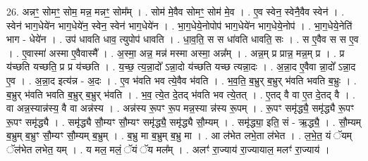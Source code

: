 \documentclass[17pt]{extarticle}
\begin{document}
26. अन्नꣳ॒॒ सोमꣳ॒॒ सोम॒ मन्न॒ मन्नꣳ॒॒ सोम᳚म् । . सोम॑ मे॒वैव सोमꣳ॒॒ सोम॑ मे॒व । . ए॒व स्वेन॒ स्वेनै॒वैव स्वेन॑ । . स्वेन॑ भाग॒धेये॑न भाग॒धेये॑न॒ स्वेन॒ स्वेन॑ भाग॒धेये॑न । . भा॒ग॒धेये॒नोपोप॑ भाग॒धेये॑न भाग॒धेये॒नोप॑ । . भा॒ग॒धेये॒नेति॑ भाग - धेये॑न । . उप॑ धावति धाव॒ त्युपोप॑ धावति । . धा॒व॒ति॒ स स धा॑वति धावति॒ सः । . स ए॒वैव स स ए॒व । . ए॒वास्मा॑ अस्मा ए॒वैवास्मै᳚ । . अ॒स्मा॒ अन्न॒ मन्न॑ मस्मा अस्मा॒ अन्न᳚म् । . अन्न॒म् प्र प्रान्न॒ मन्न॒म् प्र । . प्र य॑च्छति यच्छति॒ प्र प्र य॑च्छति । . य॒च्छ॒ त्य॒न्ना॒दो᳚ ऽन्ना॒दो य॑च्छति यच्छ त्यन्ना॒दः । . अ॒न्ना॒द ए॒वैवा न्ना॒दो᳚ ऽन्ना॒द ए॒व । . अ॒न्ना॒द इत्य॑न्न - अ॒दः । . ए॒व भ॑वति भव त्ये॒वैव भ॑वति । . भ॒व॒ति॒ ब॒भ्रुर् ब॒भ्रुर् भ॑वति भवति ब॒भ्रुः । . ब॒भ्रुर् भ॑वति भवति ब॒भ्रुर् ब॒भ्रुर् भ॑वति । . भ॒व॒ त्ये॒त दे॒तद् भ॑वति भव त्ये॒तत् । . ए॒तद् वै वा ए॒त दे॒तद् वै । . वा अन्न॒स्यान्न॑स्य॒ वै वा अन्न॑स्य । . अन्न॑स्य रू॒पꣳ रू॒प मन्न॒स्या न्न॑स्य रू॒पम् । . रू॒पꣳ समृ॑द्ध्यै॒ समृ॑द्ध्यै रू॒पꣳ रू॒पꣳ समृ॑द्ध्यै । . समृ॑द्ध्यै सौ॒म्यꣳ सौ॒म्यꣳ समृ॑द्ध्यै॒ समृ॑द्ध्यै सौ॒म्यम् । . समृ॑द्ध्या॒ इति॒ सं - ऋ॒द्ध्यै॒ । . सौ॒म्यम् ब॒भ्रुम् ब॒भ्रुꣳ सौ॒म्यꣳ सौ॒म्यम् ब॒भ्रुम् । . ब॒भ्रु मा ब॒भ्रुम् ब॒भ्रु मा । . आ ल॑भेत लभे॒ता ल॑भेत । . ल॒भे॒त॒ यं ॅयम् ॅल॑भेत लभेत॒ यम् । . य मल॒ मलं॒ ॅयं ॅय मल᳚म् । . अलꣳ॑ रा॒ज्याय॑ रा॒ज्यायाल॒ मलꣳ॑ रा॒ज्याय॑ । \newline
\end{document}
